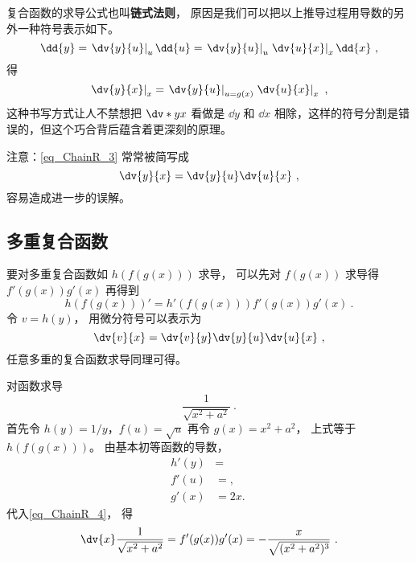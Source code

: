 复合函数的求导公式也叫\textbf{链式法则}， 原因是我们可以把以上推导过程用导数的另外一种符号表示如下。
\begin{equation}
\dd{y} = \left.\dv{y}{u}\right|_u \dd{u} = \left.\dv{y}{u}\right|_u \left.\dv{u}{x}\right|_x \dd{x}~,
\end{equation}
得
\begin{equation}\label{eq_ChainR_3}
\left.\dv{y}{x}\right|_{x} = \left.\dv{y}{u}\right|_{u = g(x)} \left.\dv{u}{x}\right|_{x}~,
\end{equation}
这种书写方式让人不禁想把 $\dv*{y}{x}$ 看做是 $\dd{y}$ 和 $\dd{x}$ 相除，这样的符号分割是错误的，但这个巧合背后蕴含着更深刻的原理。

注意：\autoref{eq_ChainR_3} 常常被简写成
\begin{equation}
\dv{y}{x} = \dv{y}{u} \dv{u}{x}~,
\end{equation}
容易造成进一步的误解。

\subsection{多重复合函数}
要对多重复合函数如 $h(f(g(x)))$ 求导， 可以先对 $f(g(x))$ 求导得 $f'(g(x))g'(x)$ 再得到
\begin{equation}
h(f(g(x)))' = h'(f(g(x)))f'(g(x))g'(x)~.
\end{equation}
令 $v = h(y)$， 用微分符号可以表示为
\begin{equation}
\dv{v}{x} = \dv{v}{y}\dv{y}{u}\dv{u}{x}~,
\end{equation}
任意多重的复合函数求导同理可得。

\begin{example}{对函数求导}
\begin{equation}
\frac{1}{\sqrt{x^2+a^2}}~.
\end{equation}
首先令 $h(y) = 1/y$，$f(u) = \sqrt{u}$ 再令 $g(x) = x^2+a^2$， 上式等于 $h(f(g(x)))$。 由基本初等函数的导数，
\begin{equation}
\begin{aligned}
h'(y) &= \\
f'(u) &=  , \\
g'(x) &= 2x.
\end{aligned}~
\end{equation}
代入\autoref{eq_ChainR_4}， 得
\begin{equation}
\dv{x} \frac{1}{\sqrt{x^2+a^2}} =  f'(g(x)) g'(x) = -\frac{x}{\sqrt{(x^2+a^2)^3}}~.
\end{equation}
\end{example}

